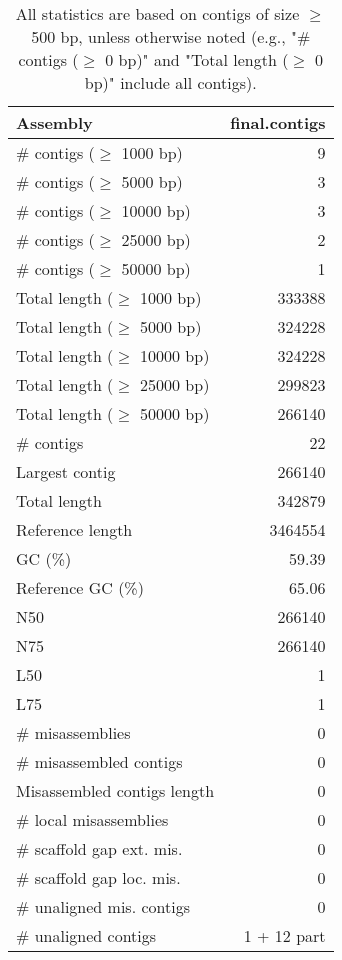 \documentclass[12pt,a4paper]{article}
\begin{document}
\begin{table}[ht]
\begin{center}
\caption{All statistics are based on contigs of size $\geq$ 500 bp, unless otherwise noted (e.g., "\# contigs ($\geq$ 0 bp)" and "Total length ($\geq$ 0 bp)" include all contigs).}
\begin{tabular}{|l*{1}{|r}|}
\hline
Assembly & final.contigs \\ \hline
\# contigs ($\geq$ 1000 bp) & 9 \\ \hline
\# contigs ($\geq$ 5000 bp) & 3 \\ \hline
\# contigs ($\geq$ 10000 bp) & 3 \\ \hline
\# contigs ($\geq$ 25000 bp) & 2 \\ \hline
\# contigs ($\geq$ 50000 bp) & 1 \\ \hline
Total length ($\geq$ 1000 bp) & 333388 \\ \hline
Total length ($\geq$ 5000 bp) & 324228 \\ \hline
Total length ($\geq$ 10000 bp) & 324228 \\ \hline
Total length ($\geq$ 25000 bp) & 299823 \\ \hline
Total length ($\geq$ 50000 bp) & 266140 \\ \hline
\# contigs & 22 \\ \hline
Largest contig & 266140 \\ \hline
Total length & 342879 \\ \hline
Reference length & 3464554 \\ \hline
GC (\%) & 59.39 \\ \hline
Reference GC (\%) & 65.06 \\ \hline
N50 & 266140 \\ \hline
N75 & 266140 \\ \hline
L50 & 1 \\ \hline
L75 & 1 \\ \hline
\# misassemblies & 0 \\ \hline
\# misassembled contigs & 0 \\ \hline
Misassembled contigs length & 0 \\ \hline
\# local misassemblies & 0 \\ \hline
\# scaffold gap ext. mis. & 0 \\ \hline
\# scaffold gap loc. mis. & 0 \\ \hline
\# unaligned mis. contigs & 0 \\ \hline
\# unaligned contigs & 1 + 12 part \\ \hline

\end{tabular}
\end{center}
\end{table}
\end{document}
